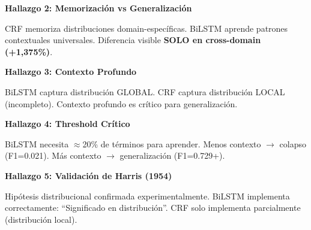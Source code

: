 \textbf{Hallazgo 2: Memorización vs Generalización}

CRF memoriza distribuciones domain-específicas. BiLSTM aprende patrones contextuales universales. Diferencia visible \textbf{SOLO en cross-domain (+1,375\%)}.

\textbf{Hallazgo 3: Contexto Profundo}

BiLSTM captura distribución GLOBAL. CRF captura distribución LOCAL (incompleto). Contexto profundo es crítico para generalización.

\textbf{Hallazgo 4: Threshold Crítico}

BiLSTM necesita $\approx$20\% de términos para aprender. Menos contexto $\rightarrow$ colapso (F1=0.021). Más contexto $\rightarrow$ generalización (F1=0.729+).

\textbf{Hallazgo 5: Validación de Harris (1954)}

Hipótesis distribucional confirmada experimentalmente. BiLSTM implementa correctamente: ``Significado en distribución''. CRF solo implementa parcialmente (distribución local).


